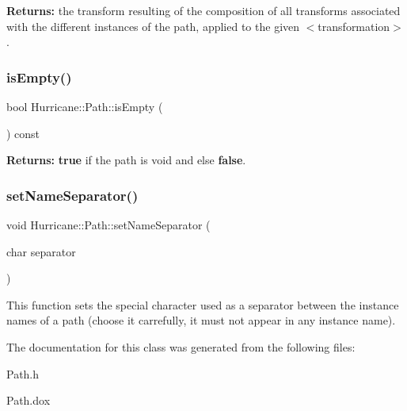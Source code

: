 {\bfseries Returns\+:} the transform resulting of the composition of all transforms associated with the different instances of the path, applied to the given {\ttfamily $<$transformation$>$}. \mbox{\label{classHurricane_1_1Path_aeddd764b4b10c72630ee81119614935a}} 
\subsubsection{\texorpdfstring{is\+Empty()}{isEmpty()}}
{\footnotesize\ttfamily bool Hurricane\+::\+Path\+::is\+Empty (\begin{DoxyParamCaption}{ }\end{DoxyParamCaption}) const}

{\bfseries Returns\+:} {\bfseries true} if the path is void and else {\bfseries false}. \mbox{\label{classHurricane_1_1Path_a505231a4bf7e8041c7a01e482505cd7a}} 
\subsubsection{\texorpdfstring{set\+Name\+Separator()}{setNameSeparator()}}
{\footnotesize\ttfamily void Hurricane\+::\+Path\+::set\+Name\+Separator (\begin{DoxyParamCaption}\item[{char}]{separator }\end{DoxyParamCaption})\hspace{0.3cm}{\ttfamily [static]}}

This function sets the special character used as a separator between the instance names of a path (choose it carrefully, it must not appear in any instance name). 

The documentation for this class was generated from the following files\+:\begin{DoxyCompactItemize}
\item 
Path.\+h\item 
Path.\+dox\end{DoxyCompactItemize}
